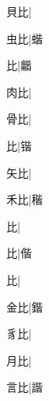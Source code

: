 \begin{multicols}{2}
{{\cjk{}{\cnsym{}　}貝比}\mktsJzrVerticalBar{}{\cjk{}{\cnsym{}　}{\cnsym{}　}{\cnsym{}　}}|{}\par
{\cjk{}{\cnsym{}　}虫比}\mktsJzrVerticalBar{}{\cjk{}{\cnsym{}　}{\cnsym{}　}{\cnsym{}　}}|{\cjk{}蝔}\par
{比}|{\cjk{}龤}\par
{\cjk{}{\cnsym{}　}肉比}\mktsJzrVerticalBar{}{\cjk{}{\cnsym{}　}{\cnsym{}　}{\cnsym{}　}}|{}\par
{\cjk{}{\cnsym{}　}骨比}\mktsJzrVerticalBar{}{\cjk{}{\cnsym{}　}{\cnsym{}　}{\cnsym{}　}}|{}\par
{比}\mktsJzrVerticalBar{}{\cjk{}{\cnsym{}　}{\cnsym{}　}{\cnsym{}　}}|{\cjk{}锴}\par
{\cjk{}{\cnsym{}　}矢比}\mktsJzrVerticalBar{}{\cjk{}{\cnsym{}　}{\cnsym{}　}{\cnsym{}　}}|{}\par
{\cjk{}{\cnsym{}　}禾比}\mktsJzrVerticalBar{}{\cjk{}{\cnsym{}　}{\cnsym{}　}{\cnsym{}　}}|{\cjk{}稭}\par
{比}\mktsJzrVerticalBar{}{\cjk{}{\cnsym{}　}{\cnsym{}　}{\cnsym{}　}}|{}\par
{比}\mktsJzrVerticalBar{}{\cjk{}{\cnsym{}　}{\cnsym{}　}{\cnsym{}　}}|{\cjk{}偕}\par
{比}\mktsJzrVerticalBar{}{\cjk{}{\cnsym{}　}{\cnsym{}　}{\cnsym{}　}}|{}\par
{\cjk{}{\cnsym{}　}金比}\mktsJzrVerticalBar{}{\cjk{}{\cnsym{}　}{\cnsym{}　}{\cnsym{}　}}|{\cjk{}鍇}\par
{\cjk{}{\cnsym{}　}豸比}\mktsJzrVerticalBar{}{\cjk{}{\cnsym{}　}{\cnsym{}　}{\cnsym{}　}}|{}\par
{\cjk{}{\cnsym{}　}月比}\mktsJzrVerticalBar{}{\cjk{}{\cnsym{}　}{\cnsym{}　}{\cnsym{}　}}|{}\par
{\cjk{}{\cnsym{}　}言比}\mktsJzrVerticalBar{}{\cjk{}{\cnsym{}　}{\cnsym{}　}{\cnsym{}　}}|{\cjk{}諧}\par
}
\end{multicols}
